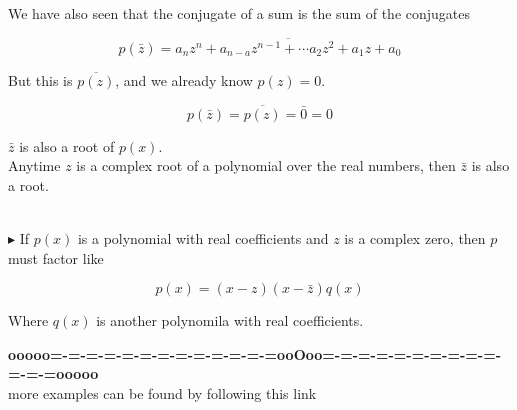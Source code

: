 \documentclass{ximera}
\begin{document}
We have also seen that the conjugate of a sum is the sum of the conjugates


\[    p(\bar{z}) = \overline{a_n z^n + a_{n-a} z^{n-1} + \cdots  a_2 z^2 +  a_1 z + a_0}   \]



But this is $\overline{p(z)}$, and we already know  $p(z) = 0$.



\[    p(\bar{z}) = \overline{p(z)} = \bar{0} = 0  \]


$\bar{z}$ is also a root of $p(x)$. \\





Anytime $z$ is a complex root of a polynomial over the real numbers, then $\bar{z}$ is also a root. \\\





\textbf{\textcolor{red!90!darkgray}{$\blacktriangleright$}}   If $p(x)$ is a polynomial with real coefficients and $z$ is a complex zero, then $p$ must factor like


\[ p(x) = (x-z) (x-\bar{z}) q(x)    \]

Where $q(x)$ is another polynomila with real coefficients.










\begin{center}
\textbf{\textcolor{green!50!black}{ooooo=-=-=-=-=-=-=-=-=-=-=-=-=ooOoo=-=-=-=-=-=-=-=-=-=-=-=-=ooooo}} \\

more examples can be found by following this link\\ 

\end{center}
\end{document}
